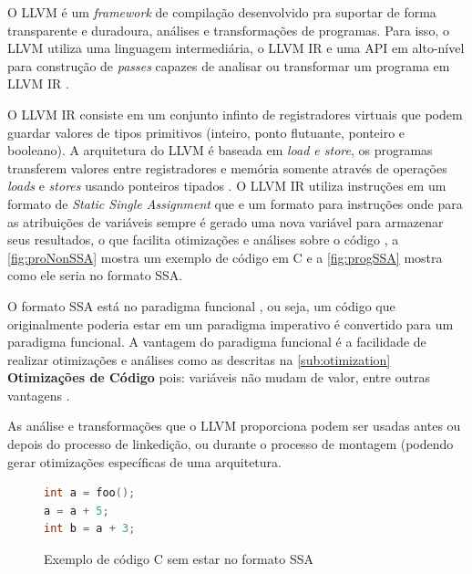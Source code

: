 O LLVM é um \textit{framework} de compilação desenvolvido pra suportar de forma transparente 
e duradoura, análises e transformações de programas. Para isso, o LLVM utiliza uma linguagem intermediária, o LLVM IR e uma API em alto-nível para construção de \textit{passes} capazes de analisar ou transformar um programa em LLVM IR \cite{Lattner:2004}. 
\par
O LLVM IR consiste em um conjunto infinto de registradores virtuais que podem guardar valores de tipos primitivos (inteiro, ponto flutuante, ponteiro e booleano). 
A arquitetura do LLVM é baseada em \textit{load e store}, os programas transferem valores entre registradores e memória somente através de operações \textit{loads} e \textit{stores} usando ponteiros tipados \cite{Lattner:2004}. 
O LLVM IR utiliza instruções em um formato de \textit{Static Single Assignment} que e um formato para instruções onde para as atribuições de variáveis sempre é gerado uma nova variável para armazenar seus resultados, o que facilita otimizações e análises sobre o código \cite{Cytron:1991}, a \autoref{fig:proNonSSA} mostra um exemplo de código em C e a \autoref{fig:progSSA} mostra como ele seria no formato SSA. 
\par
O formato SSA está no paradigma funcional \cite{Appel:1998}, ou seja, um código que originalmente poderia estar em um paradigma imperativo é convertido para um paradigma funcional. A vantagem do paradigma funcional é a facilidade de realizar otimizações e análises como as descritas na \autoref{sub:otimization} \textbf{Otimizações de Código} pois: variáveis não mudam de valor, entre outras vantagens \cite{Appel:1998}. 
\par
As análise e transformações que o LLVM proporciona podem ser usadas antes ou depois do processo de linkedição, ou durante o processo de montagem (podendo gerar otimizações específicas de uma arquitetura.

\begin{figure}[H]
	\caption{\label{fig:proNonSSA} Exemplo de código C sem estar no formato SSA }
	\begin{center}
    \begin{minipage}{0.5\textwidth}
    \begin{lstlisting}[language=C]       
int a = foo();
a = a + 5;
int b = a + 3;
	\end{lstlisting}
    \end{minipage}
	\end{center}
  \end{figure}

